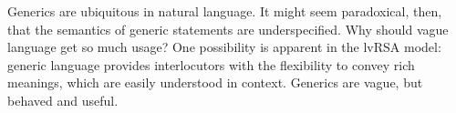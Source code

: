 \documentclass[10pt,letterpaper]{article}
\begin{document}
%

%
 


Generics are ubiquitous in natural language. It might seem paradoxical, then, that the semantics of generic statements are underspecified. Why should vague language get so much usage? One possibility is apparent in the lvRSA model: generic language provides interlocutors with the flexibility to convey rich meanings, which are easily understood in context. 
Generics are vague, but behaved and useful.
\end{document}
